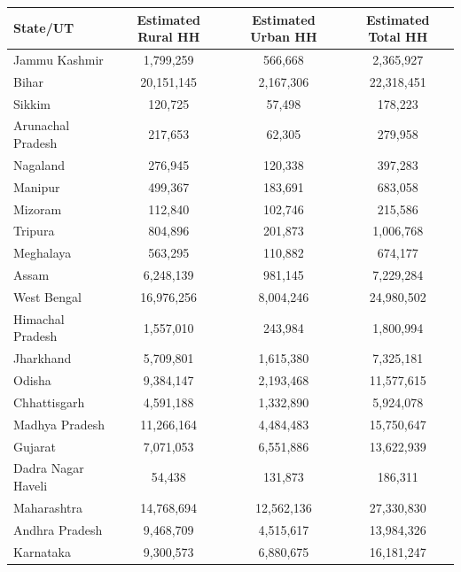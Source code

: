 \documentclass{article}
\begin{document}
	\begin{longtable}{|l|c|c|c|}
	
		\hline
		\textbf{State/UT} & \textbf{Estimated Rural HH} & \textbf{Estimated Urban HH} & \textbf{Estimated Total HH} \\ \hline
		\endhead
		
		Jammu  Kashmir        & 1,799,259   & 566,668   & 2,365,927 \\ \hline
		Bihar                 & 20,151,145  & 2,167,306  & 22,318,451 \\ \hline
		Sikkim                & 120,725     & 57,498     & 178,223 \\ \hline
		Arunachal Pradesh     & 217,653     & 62,305     & 279,958 \\ \hline
		Nagaland              & 276,945     & 120,338    & 397,283 \\ \hline
		Manipur               & 499,367     & 183,691    & 683,058 \\ \hline
		Mizoram               & 112,840     & 102,746    & 215,586 \\ \hline
		Tripura               & 804,896     & 201,873    & 1,006,768 \\ \hline
		Meghalaya             & 563,295     & 110,882    & 674,177 \\ \hline
		Assam                 & 6,248,139   & 981,145    & 7,229,284 \\ \hline
		West Bengal           & 16,976,256  & 8,004,246  & 24,980,502 \\ \hline
		Himachal Pradesh      & 1,557,010   & 243,984    & 1,800,994 \\ \hline
		Jharkhand             & 5,709,801   & 1,615,380  & 7,325,181 \\ \hline
		Odisha                & 9,384,147   & 2,193,468  & 11,577,615 \\ \hline
		Chhattisgarh          & 4,591,188   & 1,332,890  & 5,924,078 \\ \hline
		Madhya Pradesh        & 11,266,164  & 4,484,483  & 15,750,647 \\ \hline
		Gujarat               & 7,071,053   & 6,551,886  & 13,622,939 \\ \hline
		Dadra  Nagar Haveli  & 54,438      & 131,873    & 186,311 \\ \hline
		Maharashtra           & 14,768,694  & 12,562,136 & 27,330,830 \\ \hline
		Andhra Pradesh        & 9,468,709   & 4,515,617  & 13,984,326 \\ \hline
		Karnataka             & 9,300,573   & 6,880,675  & 16,181,247 \\ \hline

\end{longtable}
\end{document}
